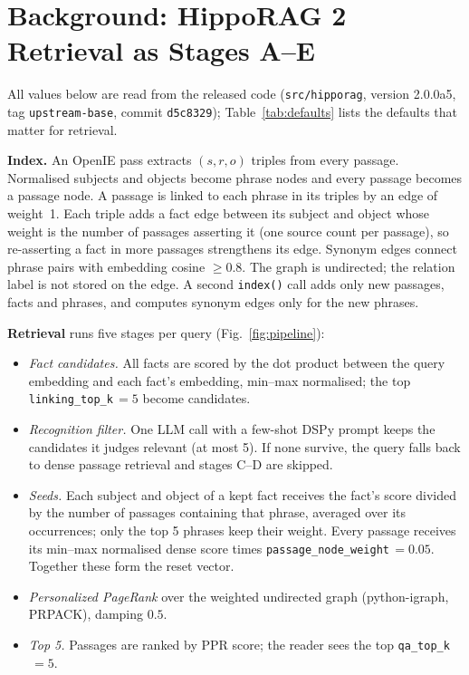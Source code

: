 \section{Background: HippoRAG 2 Retrieval as Stages A--E}\label{sec:background}

All values below are read from the released code (\texttt{src/hipporag}, version 2.0.0a5, tag \texttt{upstream-base},
commit \texttt{d5c8329}); Table~\ref{tab:defaults} lists the defaults that matter for retrieval.

\textbf{Index.} An OpenIE pass extracts $(s, r, o)$ triples from every passage. Normalised subjects and objects become
phrase nodes and every passage becomes a passage node. A passage is linked to each phrase in its triples by an edge of
weight~1. Each triple adds a fact edge between its subject and object whose weight is the number of passages asserting
it (one source count per passage), so re-asserting a fact in more passages strengthens its edge. Synonym edges connect
phrase pairs with embedding cosine $\ge 0.8$. The graph is undirected; the relation label is not stored on the edge.
A second \texttt{index()} call adds only new passages, facts and phrases, and computes synonym edges only for the new
phrases.

\textbf{Retrieval} runs five stages per query (Fig.~\ref{fig:pipeline}):
\begin{itemize}
\item[A] \emph{Fact candidates.} All facts are scored by the dot product between the query embedding and each fact's
embedding, min--max normalised; the top \texttt{linking\_top\_k}$\,=5$ become candidates.
\item[B] \emph{Recognition filter.} One LLM call with a few-shot DSPy prompt keeps the candidates it judges relevant
(at most 5). If none survive, the query falls back to dense passage retrieval and stages C--D are skipped.
\item[C] \emph{Seeds.} Each subject and object of a kept fact receives the fact's score divided by the number of
passages containing that phrase, averaged over its occurrences; only the top 5 phrases keep their weight. Every passage
receives its min--max normalised dense score times \texttt{passage\_node\_weight}$\,=0.05$. Together these form the
reset vector.
\item[D] \emph{Personalized PageRank} over the weighted undirected graph (python-igraph, PRPACK), damping $0.5$.
\item[E] \emph{Top 5.} Passages are ranked by PPR score; the reader sees the top \texttt{qa\_top\_k}$\,=5$.
\end{itemize}

